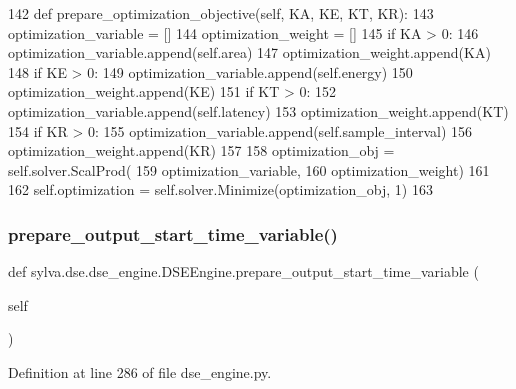 \begin{DoxyCode}
142     \textcolor{keyword}{def }prepare\_optimization\_objective(self, KA, KE, KT, KR):
143         optimization\_variable = []
144         optimization\_weight = []
145         \textcolor{keywordflow}{if} KA > 0:
146             optimization\_variable.append(self.area)
147             optimization\_weight.append(KA)
148         \textcolor{keywordflow}{if} KE > 0:
149             optimization\_variable.append(self.energy)
150             optimization\_weight.append(KE)
151         \textcolor{keywordflow}{if} KT > 0:
152             optimization\_variable.append(self.latency)
153             optimization\_weight.append(KT)
154         \textcolor{keywordflow}{if} KR > 0:
155             optimization\_variable.append(self.sample\_interval)
156             optimization\_weight.append(KR)
157 
158         optimization\_obj = self.solver.ScalProd(
159             optimization\_variable,
160             optimization\_weight)
161 
162         self.optimization = self.solver.Minimize(optimization\_obj, 1)
163 
\end{DoxyCode}
\mbox{\label{classsylva_1_1dse_1_1dse__engine_1_1_d_s_e_engine_aa92a6f059b3e74dfe5a2e92eca5ee803}} 
\subsubsection{\texorpdfstring{prepare\+\_\+output\+\_\+start\+\_\+time\+\_\+variable()}{prepare\_output\_start\_time\_variable()}}
{\footnotesize\ttfamily def sylva.\+dse.\+dse\+\_\+engine.\+D\+S\+E\+Engine.\+prepare\+\_\+output\+\_\+start\+\_\+time\+\_\+variable (\begin{DoxyParamCaption}\item[{}]{self }\end{DoxyParamCaption})}



Definition at line 286 of file dse\+\_\+engine.\+py.


